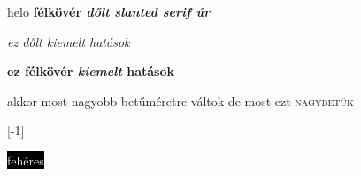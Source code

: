 \documentclass{article}
\begin{document}
helo
\bf{félkövér}
\it{dőlt}
\textsl{slanted}
\textbf{serif úr}

\textit{ez dőlt \emph{kiemelt} hatások}

\textbf{ez félkövér \emph{kiemelt} hatások}

akkor most \large nagyobb \normalsize betűméretre váltok  de most ezt \textsc{nagybetűk}


\scalebox{2}[-1]{}



\colorbox{black}{\textcolor{white}{fehéres}}

\end{document}
